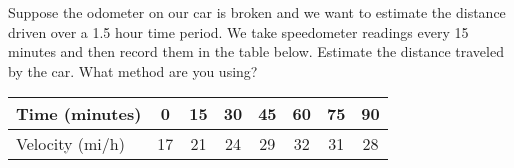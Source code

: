 \documentclass[11pt,fleqn]{article}
\begin{document}
%
%
%
%
%
%
%
%
%
%
%
%
%
%
%

\item Suppose the odometer on our car is broken and we
want to estimate the distance driven over a 1.5 hour time period. We take speedometer readings every 15 minutes and then
record them in the table below. Estimate the distance traveled by the
car. What method are you using?

\begin{center}
  \begin{tabular}[ht]{|l|c|c|c|c|c|c|c|}
    \hline 
   Time (minutes) & 0 & 15 &30 &45 &60 & 75 & 90 \\
   \hline
   Velocity (mi/h) &17 & 21 & 24 & 29 & 32 & 31 & 28 \\
  \hline
    \end{tabular}
\end{center}  
\vfill
\end{document}
